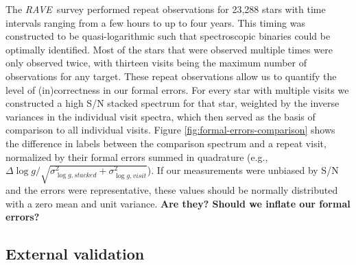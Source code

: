 \documentclass[preprint,trackchanges]{aastex}
\newcommand{\acronym}[1]{{\small{#1}}}
\newcommand{\project}[1]{\textsl{#1}}
\newcommand{\rave}{\project{\acronym{RAVE}}}
\newcommand{\stub}[1]{\textbf{#1}}
\newcommand{\logg}{\log g}
\begin{document}
The \rave\ survey performed repeat observations for 23,288 stars  with time 
intervals ranging from a few hours to up to four years.  This timing was 
constructed to be quasi-logarithmic such that spectroscopic binaries could
be optimally identified. Most of the stars that were observed multiple times
were only observed twice, with thirteen visits being the maximum number 
of observations for any target.  These repeat observations allow us to 
quantify the level of (in)correctness in our formal errors.  For every star
with multiple visits we constructed a high S/N stacked spectrum for that
star, weighted by the inverse variances in the individual visit spectra,
which then served as the basis of comparison to all individual visits.  
Figure \ref{fig:formal-errors-comparison} shows the difference in labels 
between the comparison spectrum and a repeat visit, normalized by their 
formal errors summed in quadrature (e.g., $\Delta\logg/\sqrt{\sigma_{\logg,stacked}^2 + \sigma_{\logg,visit}^2}$).
If our measurements were unbiased by S/N and the errors were representative, 
these values should be normally distributed with a zero mean and unit variance.
\stub{Are they? Should we inflate our formal errors?}




\subsection{External validation}
\label{sec:external-validation}
\end{document}
